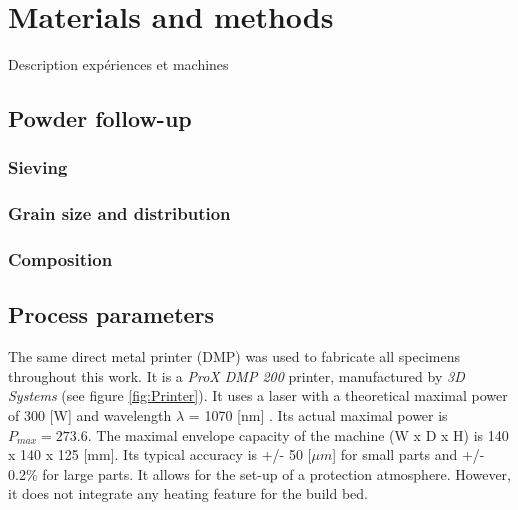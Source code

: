 \chapter{Materials and methods}
\label{Chap3}
Description expériences et machines
\section{Powder follow-up}

\subsection{Sieving}

\subsection{Grain size and distribution}

\subsection{Composition}


\section{Process parameters}
The same direct metal printer (DMP) was used to fabricate all specimens throughout this work. It is a \textit{ProX DMP 200} printer, manufactured by \textit{3D Systems} (see figure \ref{fig:Printer}). It uses a laser with a theoretical maximal power of 300 [W] and wavelength $\lambda$ = 1070 [nm] \parencite{3D}. Its actual maximal power is $P_{max}=273.6$.  The maximal envelope capacity of the machine (W x D x H) is 140 x 140 x 125 [mm]. Its typical accuracy is +/- 50 [$\mu m$] for small parts and +/- 0.2\% for large parts. It allows for the set-up of a protection atmosphere. However, it does not integrate any heating feature for the build bed.\\

